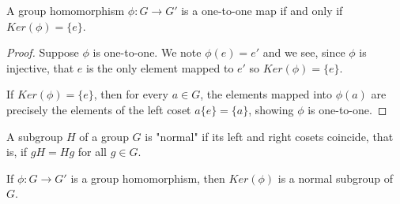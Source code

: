 \documentclass[a4paper,8pt]{article}
\begin{document}
\begin{outline}
    A group homomorphism \(\phi: G \rightarrow G'\) is a one-to-one map if and only if \(Ker(\phi) = \{e\}\).

    \begin{proof}
      \forward
        Suppose \(\phi\) is one-to-one. We note \(\phi(e) = e'\) and we see, since \(\phi\) is injective, that
        \(e\) is the only element mapped to \(e'\) so \(Ker(\phi) = \{e\}\).

      \backward
        If \(Ker(\phi) = \{e\}\), then for every \(a \in G\), the elements mapped into \(\phi(a)\) are precisely
        the elements of the left coset \(a\{e\} = \{a\}\), showing \(\phi\) is one-to-one.
    \end{proof}

    A subgroup \(H\) of a group \(G\) is "normal" if its left and right cosets coincide, that is, if \(gH = Hg\)
    for all \(g \in G\).

    If \(\phi: G \rightarrow G'\) is a group homomorphism, then \(Ker(\phi)\) is a normal subgroup of \(G\).

\end{outline}
\end{document}
